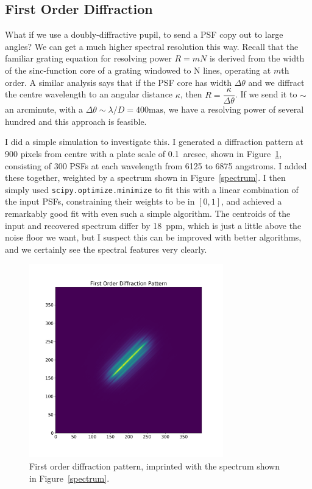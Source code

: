 \documentclass[a4paper,12pt]{article}
\begin{document}
\subsection{First Order Diffraction}

What if we use a doubly-diffractive pupil, to send a PSF copy out to large angles? We can get a much higher spectral resolution this way. Recall that the familiar grating equation for resolving power $R = mN$ is derived from the width of the sinc-function core of a grating windowed to N lines, operating at $m$th order. A similar analysis says that if the PSF core has width $\Delta \theta$ and we diffract the centre wavelength to an angular distance $\kappa$, then $R = \dfrac{\kappa}{\Delta \theta}$. If we send it to $\sim$ an arcminute, with a $\Delta\theta \sim \lambda/D = 400\text{mas}$, we have a resolving power of several hundred and this approach is feasible.

I did a simple simulation to investigate this. I generated a diffraction pattern at 900 pixels from centre with a plate scale of 0.1~arcsec, shown in Figure~\ref{firstorder}, consisting of 300 PSFs at each wavelength from 6125 to 6875 angstroms. I added these together, weighted by a spectrum shown in Figure~\ref{spectrum}. I then simply used \texttt{scipy.optimize.minimize} to fit this with a linear combination of the input PSFs, constraining their weights to be in $[0,1]$, and achieved a remarkably good fit with even such a simple algorithm. The centroids of the input and recovered spectrum differ by 18~ppm, which is just a little above the noise floor we want, but I suspect this can be improved with better algorithms, and we certainly see the spectral features very clearly.

\begin{figure}
\centering
\includegraphics[width=0.75\textwidth]{firstorder.png}
\caption{First order diffraction pattern, imprinted with the spectrum shown in Figure~\ref{spectrum}.}
\label{firstorder}
\end{figure}
\end{document}
